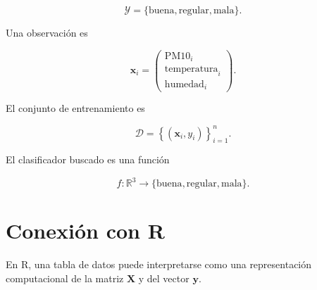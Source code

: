 \documentclass[
  spanish,
  11pt,
  letterpaper,
  DIV=11,
  numbers=noendperiod]{scrreprt}
\newenvironment{Shaded}{\begin{snugshade}}{\end{snugshade}}
\newcommand{\AttributeTok}[1]{\textcolor[rgb]{0.40,0.45,0.13}{#1}}
\newcommand{\DecValTok}[1]{\textcolor[rgb]{0.68,0.00,0.00}{#1}}
\newcommand{\FunctionTok}[1]{\textcolor[rgb]{0.28,0.35,0.67}{#1}}
\newcommand{\NormalTok}[1]{\textcolor[rgb]{0.00,0.23,0.31}{#1}}
\newcommand{\OtherTok}[1]{\textcolor[rgb]{0.00,0.23,0.31}{#1}}
\newcommand{\SpecialCharTok}[1]{\textcolor[rgb]{0.37,0.37,0.37}{#1}}
\newcommand{\StringTok}[1]{\textcolor[rgb]{0.13,0.47,0.30}{#1}}
\theoremstyle{definition}
\theoremstyle{plain}
\theoremstyle{definition}
\theoremstyle{remark}
\begin{document}
\[
\mathcal{Y}
=
\{\text{buena},\text{regular},\text{mala}\}.
\]

Una observación es

\[
\mathbf{x}_i
=
\begin{pmatrix}
\text{PM10}_i\\
\text{temperatura}_i\\
\text{humedad}_i
\end{pmatrix}.
\]

El conjunto de entrenamiento es

\[
\mathcal{D}
=
\left\{
(\mathbf{x}_i,y_i)
\right\}_{i=1}^{n}.
\]

El clasificador buscado es una función

\[
\widehat{f}:\mathbb{R}^{3}
\to
\{\text{buena},\text{regular},\text{mala}\}.
\]

\section{Conexión con R}\label{conexiuxf3n-con-r}

En R, una tabla de datos puede interpretarse como una representación
computacional de la matriz \(\mathbf{X}\) y del vector \(\mathbf{y}\).

\begin{Shaded}
\end{Shaded}
\end{document}
